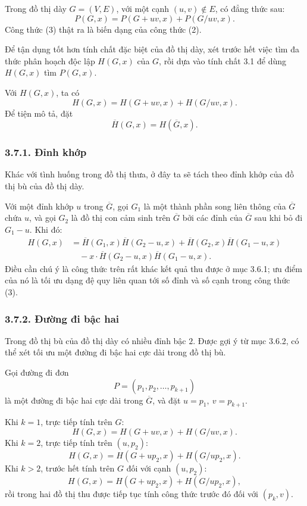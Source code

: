 \documentclass[11pt]{article}
\begin{document}
Trong đồ thị dày \(G=(V,E)\), với một cạnh \((u,v)\notin E\), có đẳng thức
sau:
\[
  P(G,x)=P(G+uv,x)+P(G/uv,x). \tag{3}
\]
Công thức (3) thật ra là biến dạng của công thức (2).

Để tận dụng tốt hơn tính chất đặc biệt của đồ thị dày, xét trước hết việc tìm
đa thức phân hoạch độc lập \(H(G,x)\) của \(G\), rồi dựa vào tính chất 3.1 để
dùng \(H(G,x)\) tìm \(P(G,x)\).

Với \(H(G,x)\), ta có
\[
  H(G,x)=H(G+uv,x)+H(G/uv,x).
\]
Để tiện mô tả, đặt
\[
  \overline{H}(G,x)=H(\overline{G},x).
\]

\subsubsection*{3.7.1. Đỉnh khớp}

Khác với tình huống trong đồ thị thưa, ở đây ta sẽ tách theo đỉnh khớp của đồ
thị bù của đồ thị dày.

Với một đỉnh khớp \(u\) trong \(\overline{G}\), gọi \(G_1\) là một thành phần
song liên thông của \(\overline{G}\) chứa \(u\), và gọi \(G_2\) là đồ thị con
cảm sinh trên \(\overline{G}\) bởi các đỉnh của \(\overline{G}\) sau khi bỏ
đi \(G_1-u\). Khi đó:
\[
\begin{aligned}
  H(G,x)
  &=\overline{H}(G_1,x)\overline{H}(G_2-u,x)
    +\overline{H}(G_2,x)\overline{H}(G_1-u,x)\\
  &\quad{}-x\cdot\overline{H}(G_2-u,x)\overline{H}(G_1-u,x).
\end{aligned}
\]
Điều cần chú ý là công thức trên rất khác kết quả thu được ở mục 3.6.1; ưu
điểm của nó là tối ưu dạng đệ quy liên quan tới số đỉnh và số cạnh trong công
thức (3).

\subsubsection*{3.7.2. Đường đi bậc hai}

Trong đồ thị bù của đồ thị dày có nhiều đỉnh bậc \(2\). Được gợi ý từ mục
3.6.2, có thể xét tối ưu một đường đi bậc hai cực dài trong đồ thị bù.

Gọi đường đi đơn
\[
  P=(p_1,p_2,\ldots,p_{k+1})
\]
là một đường đi bậc hai cực dài trong \(\overline{G}\), và đặt
\(u=p_1,\ v=p_{k+1}\).

Khi \(k=1\), trực tiếp tính trên \(G\):
\[
  H(G,x)=H(G+uv,x)+H(G/uv,x).
\]
Khi \(k=2\), trực tiếp tính trên \((u,p_2)\):
\[
  H(G,x)=H(G+up_2,x)+H(G/up_2,x).
\]
Khi \(k>2\), trước hết tính trên \(G\) đối với cạnh \((u,p_2)\):
\[
  H(G,x)=H(G+up_2,x)+H(G/up_2,x),
\]
rồi trong hai đồ thị thu được tiếp tục tính công thức trước đó đối với
\((p_k,v)\).
\end{document}
